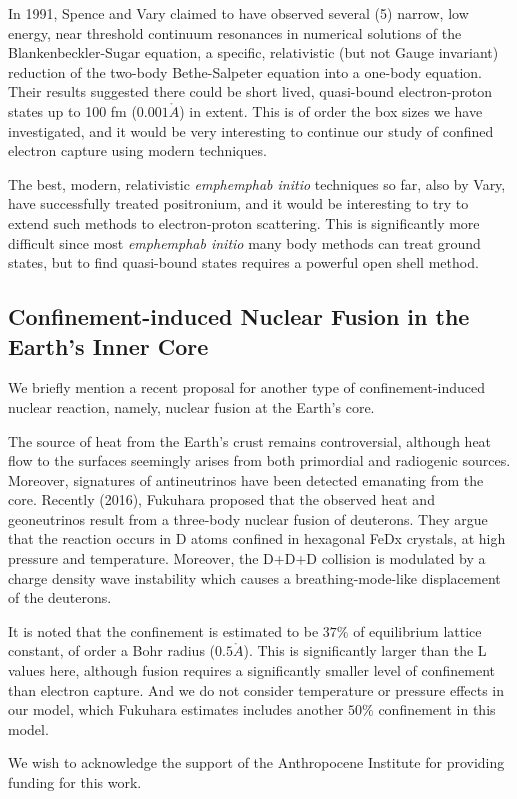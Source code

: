 \documentclass[%
 aip,
 jmp,%
 amsmath,amssymb,
 reprint,%
]{revtex4-1}
\begin{document}
In 1991, Spence and Vary claimed to have observed several (5) narrow, low energy, near threshold continuum resonances in numerical solutions of the Blankenbeckler-Sugar equation, a specific, relativistic (but not Gauge invariant) reduction of the two-body Bethe-Salpeter equation into a one-body equation. Their results suggested there could be short lived, quasi-bound electron-proton states up to 100 fm ($0.001\mathring{A}$) in extent.  This is of order the box sizes we have investigated, and it would be very interesting to continue our study of confined electron capture using modern techniques.  

The best, modern, relativistic \emph{emph{emph{ab initio}}} techniques so far, also by Vary, have successfully treated positronium,\cite{positroniumQFT} and it would be interesting to try to extend such methods to electron-proton scattering. This is significantly more difficult since most \emph{emph{emph{ab initio}}} many body methods can treat ground states, but to find quasi-bound states  requires a powerful open shell method.

\subsection{Confinement-induced Nuclear Fusion in the Earth's Inner Core}

We briefly mention a recent proposal for another type of  confinement-induced nuclear reaction,
namely, nuclear fusion at the Earth's core.

The source of heat from the Earth's crust remains controversial, although heat flow
to the surfaces seemingly arises from both primordial and radiogenic sources.
Moreover, signatures of antineutrinos have been detected emanating from the core.
Recently (2016), Fukuhara proposed that the observed heat and geoneutrinos
result from a three-body nuclear fusion of deuterons.\cite{fukuhara}  They argue that
the reaction occurs in D atoms confined in hexagonal FeDx crystals, at high pressure
and temperature.  Moreover, the D+D+D collision is modulated by a charge density wave
instability which causes a breathing-mode-like displacement of the deuterons.

It is noted that the confinement is estimated to be $37\%$ of equilibrium lattice constant,
of order a Bohr radius ($0.5\mathring{A}$).  This is significantly larger than the L values here,
although fusion requires a significantly smaller level of confinement than electron capture.
And we do not consider temperature or pressure effects in our model, which Fukuhara
estimates includes another $50\%$ confinement in this model.

\begin{acknowledgments}
We wish to acknowledge the support of the Anthropocene Institute for providing funding for this work.

\end{acknowledgments}
\end{document}
